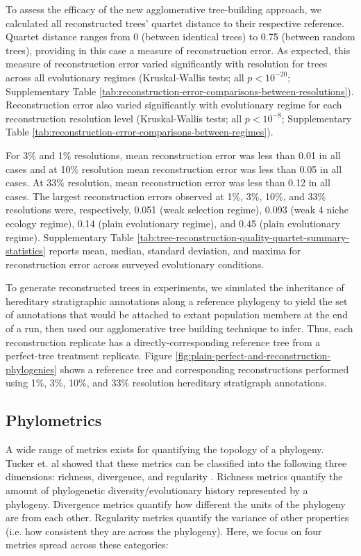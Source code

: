 To assess the efficacy of the new agglomerative tree-building approach, we calculated all reconstructed trees' quartet distance to their respective reference.
Quartet distance ranges from 0 (between identical trees) to 0.75 (between random trees), providing in this case a measure of reconstruction error.
As expected, this measure of reconstruction error varied significantly with resolution for trees across all evolutionary regimes (Kruskal-Wallis tests; all $p < 10^{-20}$; Supplementary Table \ref{tab:reconstruction-error-comparisons-between-resolutions}).
Reconstruction error also varied significantly with evolutionary regime for each reconstruction resolution level (Kruskal-Wallis tests; all $p < 10^{-8}$; Supplementary Table \ref{tab:reconstruction-error-comparisons-between-regimes}).

For 3\% and 1\% resolutions, mean reconstruction error was less than 0.01 in all cases and at 10\% resolution mean reconstruction error was less than 0.05 in all cases.
At 33\% resolution, mean reconstruction error was less than 0.12 in all cases.
The largest reconstruction errors observed at 1\%, 3\%, 10\%, and 33\% resolutions were, respectively, 0.051 (weak selection regime), 0.093 (weak 4 niche ecology regime), 0.14 (plain evolutionary regime), and 0.45 (plain evolutionary regime).
Supplementary Table \ref{tab:tree-reconstruction-quality-quartet-summary-statistics} reports mean, median, standard deviation, and maxima for reconstruction error across surveyed evolutionary conditions.

To generate reconstructed trees in experiments, we simulated the inheritance of hereditary stratigraphic annotations along a reference phylogeny to yield the set of annotations that would be attached to extant population members at the end of a run, then used our agglomerative tree building technique to infer.
Thus, each reconstruction replicate has a directly-corresponding reference tree from a perfect-tree treatment replicate.
Figure \ref{fig:plain-perfect-and-reconstruction-phylogenies} shows a reference tree and corresponding reconstructions performed using 1\%, 3\%, 10\%, and 33\% resolution hereditary stratigraph annotations.

\subsection{Phylometrics}

A wide range of metrics exists for quantifying the topology of a phylogeny.
Tucker et.
al showed that these metrics can be classified into the following three dimensions: richness, divergence, and regularity \citep{tuckerGuidePhylogeneticMetrics2017}.
Richness metrics quantify the amount of phylogenetic diversity/evolutionary history represented by a phylogeny.
Divergence metrics quantify how different the units of the phylogeny are from each other.
Regularity metrics quantify the variance of other properties (i.e. how consistent they are across the phylogeny).
Here, we focus on four metrics spread across these categories:

